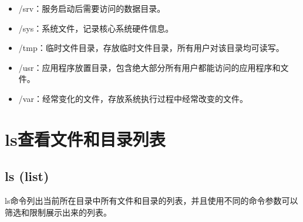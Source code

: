 \documentclass[12pt, openany, oneside]{book}
\begin{document}
\begin{itemize}
    \item /srv：服务启动后需要访问的数据目录。

    \item /sys：系统文件，记录核心系统硬件信息。

    \item /tmp：临时文件目录，存放临时文件目录，所有用户对该目录均可读写。

    \item /usr：应用程序放置目录，包含绝大部分所有用户都能访问的应用程序和文件。

    \item /var：经常变化的文件，存放系统执行过程中经常改变的文件。
\end{itemize}

\newpage

\section{ls查看文件和目录列表}

\subsection{ls (list)}

ls命令列出当前所在目录中所有文件和目录的列表，并且使用不同的命令参数可以筛选和限制展示出来的列表。

\begin{table}[H]
    \centering
    \caption{ls参数说明}
\end{table}
\end{document}

